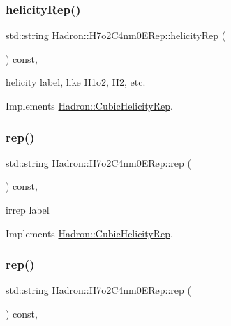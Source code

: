 \subsubsection{\texorpdfstring{helicityRep()}{helicityRep()}\hspace{0.1cm}{\footnotesize\ttfamily [3/3]}}
{\footnotesize\ttfamily std\+::string Hadron\+::\+H7o2\+C4nm0\+E\+Rep\+::helicity\+Rep (\begin{DoxyParamCaption}{ }\end{DoxyParamCaption}) const\hspace{0.3cm}{\ttfamily [inline]}, {\ttfamily [virtual]}}

helicity label, like H1o2, H2, etc. 

Implements \mbox{\hyperlink{structHadron_1_1CubicHelicityRep_af1096946b7470edf0a55451cc662f231}{Hadron\+::\+Cubic\+Helicity\+Rep}}.

\mbox{\label{structHadron_1_1H7o2C4nm0ERep_a60af54c0200a7bd60fc3f4346116cc34}} 
\subsubsection{\texorpdfstring{rep()}{rep()}\hspace{0.1cm}{\footnotesize\ttfamily [1/3]}}
{\footnotesize\ttfamily std\+::string Hadron\+::\+H7o2\+C4nm0\+E\+Rep\+::rep (\begin{DoxyParamCaption}{ }\end{DoxyParamCaption}) const\hspace{0.3cm}{\ttfamily [inline]}, {\ttfamily [virtual]}}

irrep label 

Implements \mbox{\hyperlink{structHadron_1_1CubicHelicityRep_a8cdd86f068a167dc96faef02bfb8a33d}{Hadron\+::\+Cubic\+Helicity\+Rep}}.

\mbox{\label{structHadron_1_1H7o2C4nm0ERep_a60af54c0200a7bd60fc3f4346116cc34}} 
\subsubsection{\texorpdfstring{rep()}{rep()}\hspace{0.1cm}{\footnotesize\ttfamily [2/3]}}
{\footnotesize\ttfamily std\+::string Hadron\+::\+H7o2\+C4nm0\+E\+Rep\+::rep (\begin{DoxyParamCaption}{ }\end{DoxyParamCaption}) const\hspace{0.3cm}{\ttfamily [inline]}, {\ttfamily [virtual]}}


